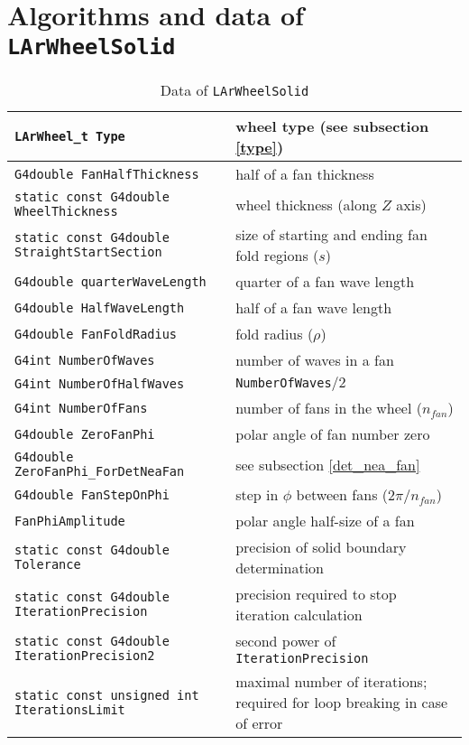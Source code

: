 \documentclass{article}
\begin{document}
\section{Algorithms and data of {\tt LArWheelSolid}}
\begin{table}
\caption{Data of {\tt LArWheelSolid}}
\label{data}
\centering
\begin{tabular}{|p{}|p{}|}
\hline
{\tt LArWheel\_t Type} & wheel type (see subsection \ref{type})\\ \hline
{\tt G4double FanHalfThickness} & half of a fan thickness\\ \hline
{\tt static const G4double WheelThickness} & wheel thickness (along $Z$ axis)\\
\hline 
{\tt static const G4double StraightStartSection} & size of starting and
ending fan fold regions ($s$)\\ \hline
{\tt G4double quarterWaveLength} & quarter of a fan wave length \\ \hline 
{\tt G4double HalfWaveLength} & half of a fan wave length \\ \hline
{\tt G4double FanFoldRadius} & fold radius ($\rho$)\\ \hline
{\tt G4int NumberOfWaves} & number of waves in a fan\\ \hline
{\tt G4int NumberOfHalfWaves} & {\tt NumberOfWaves}$ / 2$\\ \hline
{\tt G4int NumberOfFans} & number of fans in the wheel ($n_{fan}$) \\
\hline 
{\tt G4double ZeroFanPhi} & polar angle of fan number zero\\ \hline
{\tt G4double ZeroFanPhi\_ForDetNeaFan} & see subsection \ref{det_nea_fan} \\ \hline
{\tt G4double FanStepOnPhi} & step in $\phi$ between fans
($2\pi / n_{fan}$)\\ \hline
{\tt FanPhiAmplitude} & polar angle half-size of a fan \\ \hline
{\tt static const G4double Tolerance} & precision of solid boundary
determination  \\ \hline
{\tt static const G4double IterationPrecision } & precision required to stop
iteration calculation\\ \hline
{\tt static const G4double IterationPrecision2} & second power of
{\tt IterationPrecision }\\ \hline 
{\tt static const unsigned int IterationsLimit} & maximal number of iterations;
required for loop breaking in case of error\\ 

\end{tabular}
\end{table}
\end{document}
